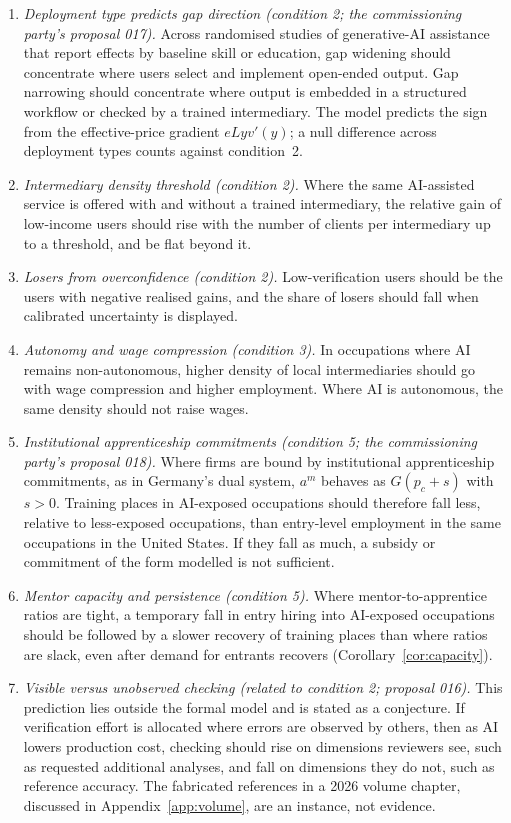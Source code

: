 \documentclass[12pt]{article}
\theoremstyle{remark}
\begin{document}
\begin{enumerate}[label=P\arabic*.,leftmargin=2.5em]
\item \emph{Deployment type predicts gap direction (condition 2; the commissioning party's proposal 017).} Across randomised studies of generative-AI assistance that report effects by baseline skill or education, gap widening should concentrate where users select and implement open-ended output. Gap narrowing should concentrate where output is embedded in a structured workflow or checked by a trained intermediary. The model predicts the sign from the effective-price gradient $eLyv'(y)$; a null difference across deployment types counts against condition~2.
\item \emph{Intermediary density threshold (condition 2).} Where the same AI-assisted service is offered with and without a trained intermediary, the relative gain of low-income users should rise with the number of clients per intermediary up to a threshold, and be flat beyond it.
\item \emph{Losers from overconfidence (condition 2).} Low-verification users should be the users with negative realised gains, and the share of losers should fall when calibrated uncertainty is displayed.
\item \emph{Autonomy and wage compression (condition 3).} In occupations where AI remains non-autonomous, higher density of local intermediaries should go with wage compression and higher employment. Where AI is autonomous, the same density should not raise wages.
\item \emph{Institutional apprenticeship commitments (condition 5; the commissioning party's proposal 018).} Where firms are bound by institutional apprenticeship commitments, as in Germany's dual system, $a^m$ behaves as $G(p_c+s)$ with $s>0$. Training places in AI-exposed occupations should therefore fall less, relative to less-exposed occupations, than entry-level employment in the same occupations in the United States. If they fall as much, a subsidy or commitment of the form modelled is not sufficient.
\item \emph{Mentor capacity and persistence (condition 5).} Where mentor-to-apprentice ratios are tight, a temporary fall in entry hiring into AI-exposed occupations should be followed by a slower recovery of training places than where ratios are slack, even after demand for entrants recovers (Corollary~\ref{cor:capacity}).
\item \emph{Visible versus unobserved checking (related to condition 2; proposal 016).} This prediction lies outside the formal model and is stated as a conjecture. If verification effort is allocated where errors are observed by others, then as AI lowers production cost, checking should rise on dimensions reviewers see, such as requested additional analyses, and fall on dimensions they do not, such as reference accuracy. The fabricated references in a 2026 volume chapter, discussed in Appendix~\ref{app:volume}, are an instance, not evidence.
\end{enumerate}
\end{document}
